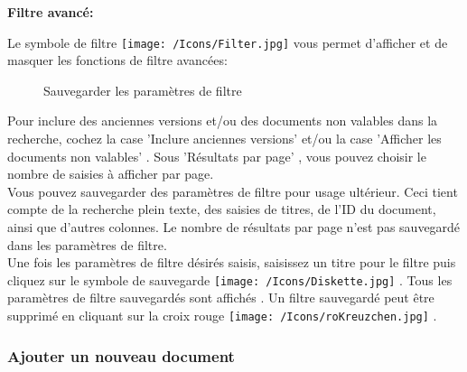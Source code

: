 \vspace{\baselineskip}

\textbf{Filtre avancé:}\\
\label{bkm:Ref201704051}

Le symbole de filtre \texttt{[image: /Icons/Filter.jpg]}  vous permet d'afficher et de masquer les fonctions de filtre avancées:

\begin{figure}[H]
\caption{Sauvegarder les paramètres de filtre}
\end{figure}

Pour inclure des anciennes versions et/ou des documents non valables dans la recherche, cochez la case 'Inclure anciennes versions'  et/ou la case 'Afficher les documents non valables' . Sous 'Résultats par page' , vous pouvez choisir le nombre de saisies à afficher par page.\\
Vous pouvez sauvegarder des paramètres de filtre pour usage ultérieur. Ceci tient compte de la recherche plein texte, des saisies de titres, de l'ID du document, ainsi que d'autres colonnes. Le nombre de résultats par page n'est pas sauvegardé dans les paramètres de filtre.\\
Une fois les paramètres de filtre désirés saisis, saisissez un titre pour le filtre  puis cliquez sur le symbole de sauvegarde \texttt{[image: /Icons/Diskette.jpg]} . Tous les paramètres de filtre sauvegardés sont affichés . Un filtre sauvegardé peut être supprimé en cliquant sur la croix rouge \texttt{[image: /Icons/roKreuzchen.jpg]} .


\subsubsection{Ajouter un nouveau document}
\label{bkm:Ref442863508}\label{bkm:Ref442787515}\label{bkm:Ref442778397}\label{bkm:Ref442770648}\label{bkm:Ref442769978}

\begin{figure}[H]
\end{figure}

